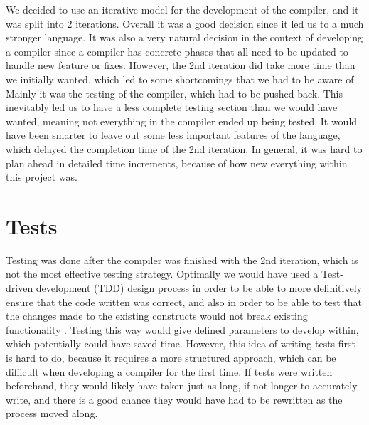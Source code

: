 We decided to use an iterative model for the development of the compiler, and it was split into 2 iterations. Overall it was a good decision since it led us to a much stronger language. It was also a very natural decision in the context of developing a compiler since a compiler has concrete phases that all need to be updated to handle new feature or fixes. However, the 2nd iteration did take more time than we initially wanted, which led to some shortcomings that we had to be aware of. Mainly it was the testing of the compiler, which had to be pushed back. This inevitably led us to have a less complete testing section than we would have wanted, meaning not everything in the compiler ended up being tested. It would have been smarter to leave out some less important features of the language, which delayed the completion time of the 2nd iteration. In general, it was hard to plan ahead in detailed time increments, because of how new everything within this project was.

\section{Tests}
Testing was done after the compiler was finished with the 2nd iteration, which is not the most effective testing strategy. Optimally we would have used a Test-driven development (TDD) design process in order to be able to more definitively ensure that the code written was correct, and also in order to be able to test that the changes made to the existing constructs would not break existing functionality \cite{TDD}. Testing this way would give defined parameters to develop within, which potentially could have saved time. However, this idea of writing tests first is hard to do, because it requires a more structured approach, which can be difficult when developing a compiler for the first time. If tests were written beforehand, they would likely have taken just as long, if not longer to accurately write, and there is a good chance they would have had to be rewritten as the process moved along.


